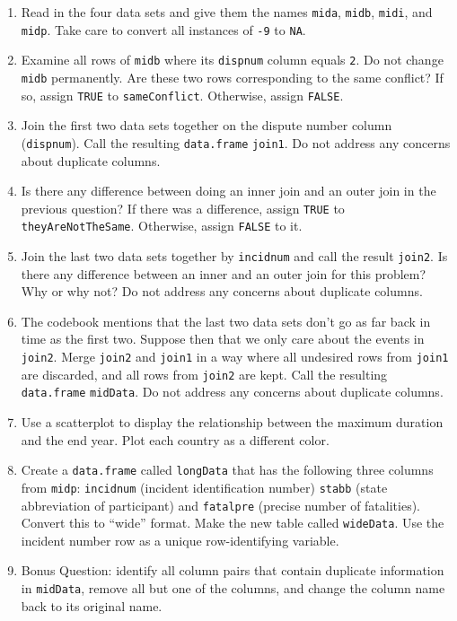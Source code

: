 \documentclass[12pt,krantz2]{krantz}
\providecommand{\tightlist}{%
  \setlength{\itemsep}{0pt}\setlength{\parskip}{0pt}}
\begin{document}
\begin{enumerate}
\def\labelenumi{\alph{enumi})}
\tightlist
\item
  Read in the four data sets and give them the names \texttt{mida}, \texttt{midb}, \texttt{midi}, and \texttt{midp}. Take care to convert all instances of \texttt{-9} to \texttt{NA}.
\item
  Examine all rows of \texttt{midb} where its \texttt{dispnum} column equals \texttt{2}. Do not change \texttt{midb} permanently. Are these two rows corresponding to the same conflict? If so, assign \texttt{TRUE} to \texttt{sameConflict}. Otherwise, assign \texttt{FALSE}.
\item
  Join the first two data sets together on the dispute number column (\texttt{dispnum}). Call the resulting \texttt{data.frame} \texttt{join1}. Do not address any concerns about duplicate columns.
\item
  Is there any difference between doing an inner join and an outer join in the previous question? If there was a difference, assign \texttt{TRUE} to \texttt{theyAreNotTheSame}. Otherwise, assign \texttt{FALSE} to it.
\item
  Join the last two data sets together by \texttt{incidnum} and call the result \texttt{join2}. Is there any difference between an inner and an outer join for this problem? Why or why not? Do not address any concerns about duplicate columns.
\item
  The codebook mentions that the last two data sets don't go as far back in time as the first two. Suppose then that we only care about the events in \texttt{join2}. Merge \texttt{join2} and \texttt{join1} in a way where all undesired rows from \texttt{join1} are discarded, and all rows from \texttt{join2} are kept. Call the resulting \texttt{data.frame} \texttt{midData}. Do not address any concerns about duplicate columns.
\item
  Use a scatterplot to display the relationship between the maximum duration and the end year. Plot each country as a different color.
\item
  Create a \texttt{data.frame} called \texttt{longData} that has the following three columns from \texttt{midp}: \texttt{incidnum} (incident identification number) \texttt{stabb} (state abbreviation of participant) and \texttt{fatalpre} (precise number of fatalities). Convert this to ``wide'' format. Make the new table called \texttt{wideData}. Use the incident number row as a unique row-identifying variable.
\item
  Bonus Question: identify all column pairs that contain duplicate information in \texttt{midData}, remove all but one of the columns, and change the column name back to its original name.
\end{enumerate}
\end{document}
